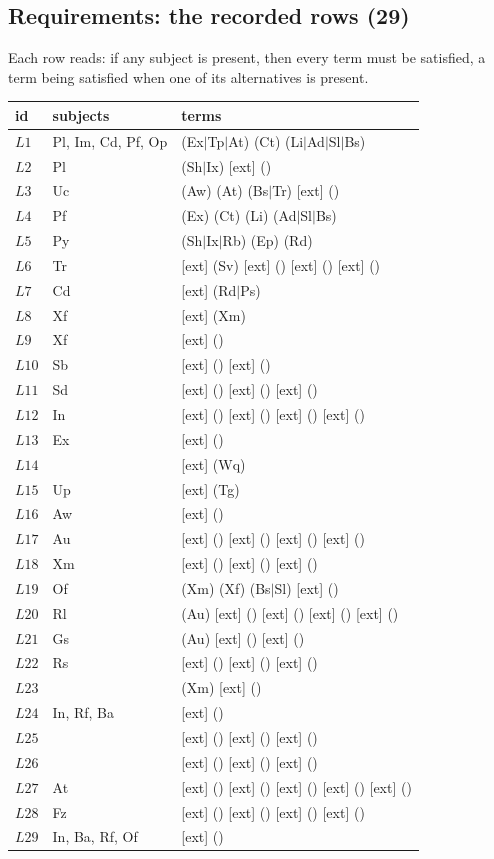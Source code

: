 \subsection{Requirements: the recorded rows (29)}

Each row reads: if any subject is present, then every term must be satisfied,
a term being satisfied when one of its alternatives is present.

\begin{longtable}{lll}
\toprule
id & subjects & terms\\
\midrule\endhead
$L1$ & Pl, Im, Cd, Pf, Op & (Ex$\mid$Tp$\mid$At) (Ct) (Li$\mid$Ad$\mid$Sl$\mid$Bs)\\
$L2$ & Pl & (Sh$\mid$Ix) [ext] ()\\
$L3$ & Uc & (Aw) (At) (Bs$\mid$Tr) [ext] ()\\
$L4$ & Pf & (Ex) (Ct) (Li) (Ad$\mid$Sl$\mid$Bs)\\
$L5$ & Py & (Sh$\mid$Ix$\mid$Rb) (Ep) (Rd)\\
$L6$ & Tr & [ext] (Sv) [ext] () [ext] () [ext] ()\\
$L7$ & Cd & [ext] (Rd$\mid$Ps)\\
$L8$ & Xf & [ext] (Xm)\\
$L9$ & Xf & [ext] ()\\
$L10$ & Sb & [ext] () [ext] ()\\
$L11$ & Sd & [ext] () [ext] () [ext] ()\\
$L12$ & In & [ext] () [ext] () [ext] () [ext] ()\\
$L13$ & Ex & [ext] ()\\
$L14$ &  & [ext] (Wq)\\
$L15$ & Up & [ext] (Tg)\\
$L16$ & Aw & [ext] ()\\
$L17$ & Au & [ext] () [ext] () [ext] () [ext] ()\\
$L18$ & Xm & [ext] () [ext] () [ext] ()\\
$L19$ & Of & (Xm) (Xf) (Bs$\mid$Sl) [ext] ()\\
$L20$ & Rl & (Au) [ext] () [ext] () [ext] () [ext] ()\\
$L21$ & Gs & (Au) [ext] () [ext] ()\\
$L22$ & Rs & [ext] () [ext] () [ext] ()\\
$L23$ &  & (Xm) [ext] ()\\
$L24$ & In, Rf, Ba & [ext] ()\\
$L25$ &  & [ext] () [ext] () [ext] ()\\
$L26$ &  & [ext] () [ext] () [ext] ()\\
$L27$ & At & [ext] () [ext] () [ext] () [ext] () [ext] ()\\
$L28$ & Fz & [ext] () [ext] () [ext] () [ext] ()\\
$L29$ & In, Ba, Rf, Of & [ext] ()\\
\bottomrule
\end{longtable}

